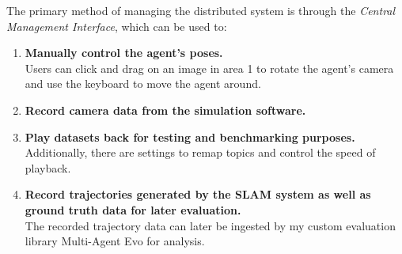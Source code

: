 The primary method of managing the distributed system is through the \textit{Central Management Interface}, which can be used to: \noparskip
\smallbreak
{
    \begin{enumerate}
        \item \textbf{Manually control the agent's poses.} \\
              Users can click and drag on an image in area 1 to rotate the agent's camera and use the keyboard to move the agent around.
        \item \textbf{Record camera data from the simulation software.}
        \item \textbf{Play datasets back for testing and benchmarking purposes.} \\
              Additionally, there are settings to remap topics and control the speed of playback.
        \item \textbf{Record trajectories generated by the SLAM system as well as ground truth data for later evaluation.} \\
              The recorded trajectory data can later be ingested by my custom evaluation library Multi-Agent Evo for analysis.
    \end{enumerate}
}


